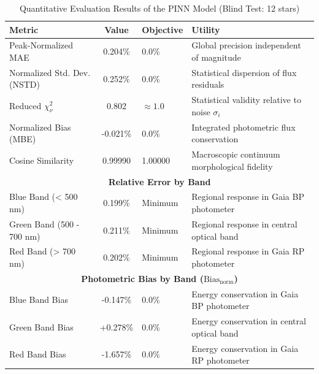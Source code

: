 
\begin{table}[htpb]
\centering
\caption{Quantitative Evaluation Results of the PINN Model (Blind Test: 12 stars)}
\label{tab:pinn_evaluation}
\begin{tabular}{lcll}
\hline
\textbf{Metric} & \textbf{Value} & \textbf{Objective} & \textbf{Utility} \\
\hline
Peak-Normalized MAE & 0.204\% & 0.0\% & Global precision independent of magnitude \\
Normalized Std. Dev. (NSTD) & 0.252\% & 0.0\% & Statistical dispersion of flux residuals \\
Reduced $\chi^2_\nu$ & 0.802 & $\approx 1.0$ & Statistical validity relative to noise $\sigma_i$ \\
Normalized Bias (MBE) & -0.021\% & 0.0\% & Integrated photometric flux conservation \\
Cosine Similarity & 0.99990 & 1.00000 & Macroscopic continuum morphological fidelity \\
\hline
\multicolumn{4}{c}{\textbf{Relative Error by Band}} \\
\hline
Blue Band (< 500 nm) & 0.199\% & Minimum & Regional response in Gaia BP photometer \\
Green Band (500 - 700 nm) & 0.211\% & Minimum & Regional response in central optical band \\
Red Band (> 700 nm) & 0.202\% & Minimum & Regional response in Gaia RP photometer \\
\hline
\multicolumn{4}{c}{\textbf{Photometric Bias by Band ($\text{Bias}_{\text{norm}}$)}} \\
\hline
Blue Band Bias & -0.147\% & 0.0\% & Energy conservation in Gaia BP photometer \\
Green Band Bias & +0.278\% & 0.0\% & Energy conservation in central optical band \\
Red Band Bias & -1.657\% & 0.0\% & Energy conservation in Gaia RP photometer \\
\hline
\end{tabular}
\end{table}
